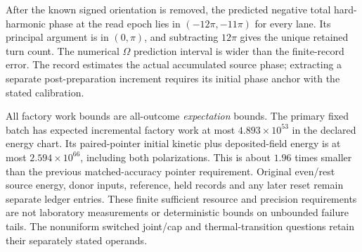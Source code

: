 After the known signed orientation is removed, the predicted negative total
hard-harmonic phase at the read epoch lies in $(-12\pi,-11\pi)$ for every
lane. Its principal argument is in $(0,\pi)$, and subtracting $12\pi$ gives
the unique retained turn count. The numerical $\Omega$ prediction interval
is wider than the finite-record error. The record estimates the actual
accumulated source phase; extracting a separate post-preparation increment
requires its initial phase anchor with the stated calibration.

All factory work bounds are all-outcome \emph{expectation} bounds. The primary
fixed batch has expected incremental factory work at most
$4.893\times10^{53}$ in the declared energy chart. Its paired-pointer initial
kinetic plus deposited-field energy is at most $2.594\times10^{66}$, including
both polarizations. This is about $1.96$ times smaller than the previous
matched-accuracy pointer requirement. Original even/rest source energy,
donor inputs, reference, held records and any later reset remain separate
ledger entries. These finite sufficient resource and precision requirements
are not laboratory measurements or deterministic bounds on unbounded
failure tails. The nonuniform switched joint/cap and thermal-transition
questions retain their separately stated operands.
